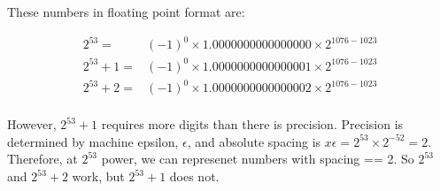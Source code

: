 \documentclass{article}\usepackage[]{graphicx}\usepackage[]{color}
\begin{document}
These numbers in floating point format are:


$$\begin{aligned}
    2^{53} =& (-1)^0 \times 1.0000000000000000 \times 2^{1076 - 1023}  \\
    2^{53} + 1 =& (-1)^0 \times 1.0000000000000001 \times 2^{1076-1023} \\
    2^{53} + 2 =& (-1)^0 \times 1.0000000000000002 \times 2^{1076-1023} \\
\end{aligned}$$


However, $2^{53} +1$ requires more digits than there is precision. Precision is determined by machine epsilon, $\epsilon$, and absolute spacing is $x\epsilon = 2^{53} \times 2^{-52} = 2$. Therefore, at $2^{53}$ power, we can represenet numbers with spacing == 2. So $2^{53}$ and $2^{53}+2$ work, but $2^{53}+1$ does not.
\end{document}
